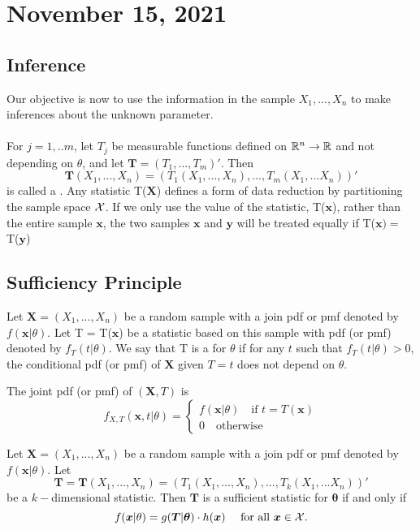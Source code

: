 \section{November 15, 2021}
\subsection{Inference}
Our objective is now to use the information in the sample $X_1,...,X_n$ to make inferences about the unknown parameter.
\\
\\ 
For $j = 1,..m$, let $T_j$ be measurable functions defined on $\mathbb R^n \to \mathbb R$ and not depending on $\theta$, and let $\boldsymbol{T} = (T_1,...,T_m)'$. Then
    $$
    \boldsymbol{T}(X_1,...,X_n) = \left(
    T_1(X_1,...,X_n),...,T_m(X_1,...X_n)
    \right)'
    $$
is called a .
Any statistic T($\boldsymbol{X}$) defines a form of data reduction by partitioning the sample space $\mathcal X$. If we only use the value of the statistic, T($\boldsymbol{x}$), rather than the entire sample $\boldsymbol{x}$, the two samples $\boldsymbol{x}$ and $\boldsymbol{y}$ will be treated equally if T($\boldsymbol{x}) =$ T($\boldsymbol{y}$) 
\subsection{Sufficiency Principle}
\begin{definition}
    Let $\boldsymbol{X} = (X_1,...,X_n)$ be a random sample with a join pdf or pmf denoted by $f(\boldsymbol{x}|\theta)$. Let T = T($\boldsymbol{x}$)
    be a statistic based on this sample with pdf (or pmf) denoted by $f_T(t|\theta)$. We say that T is a  for $\theta$ if for any $t$ such that $f_T(t|\theta) > 0$, the conditional pdf (or pmf) of $\boldsymbol{X}$ given $T=t$ does not depend on $\theta$.
    \end{definition}
 The joint pdf (or pmf) of $(\boldsymbol{X},T)$ is 
    $$
    f_{X,T}(\boldsymbol{x},t| \theta) =
        \begin{cases}
            f(\boldsymbol{x}| \theta) \quad \text{if } t= T(\boldsymbol{x}) \\
            0 \quad \text{otherwise}
        \end{cases}
    $$
    
\begin{theorem}
    Let $\boldsymbol{X} = (X_1,...,X_n)$ be a random sample with a join pdf or pmf denoted by $f(\boldsymbol{x}|\theta)$. Let
    $$\boldsymbol{T} = \boldsymbol{T}(X_1,...,X_n) = \left(
    T_1(X_1,...,X_n),...,T_k(X_1,...X_n)
    \right)'$$ be a $k-$dimensional statistic. Then $\boldsymbol{T}$ is a sufficient statistic for $\boldsymbol{\theta}$ if and only if 
    $$
    f(\boldsymbol{x}|\theta) = g(\boldsymbol{T}|\boldsymbol{\theta})\cdot h(\boldsymbol{x}) \quad \text{ for all } \boldsymbol{x} \in \mathcal X.
    $$

\end{theorem}